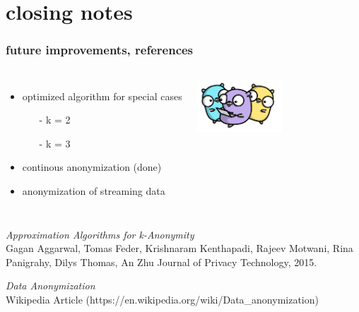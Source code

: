 \documentclass{beamer}
\begin{document}
\section{closing notes}
\begin{frame}
  \frametitle{future improvements, references}
  \begin{columns}  
  \begin{itemize}
    \item optimized algorithm for special cases
    \begin{itemize}
      \item[-]k = 2
      \item[-]k = 3
    \end{itemize}
    \item continous anonymization (\checkmark done)
    \item anonymization of streaming data
  \end{itemize}
  \includegraphics[width=120px]{../images/gophers.png}
  \end{columns}
  \vspace{10pt}
  \begin{thebibliography}{2}
  \scriptsize
  \textit{Approximation Algorithms for k-Anonymity}\\
  Gagan Aggarwal, Tomas Feder, Krishnaram Kenthapadi, Rajeev Motwani, Rina Panigrahy, Dilys Thomas, An Zhu
  Journal of Privacy Technology, 2015.

    \textit{Data Anonymization}\\
    Wikipedia Article (https://en.wikipedia.org/wiki/Data\_anonymization)

  \end{thebibliography}

\end{frame}
\end{document}
